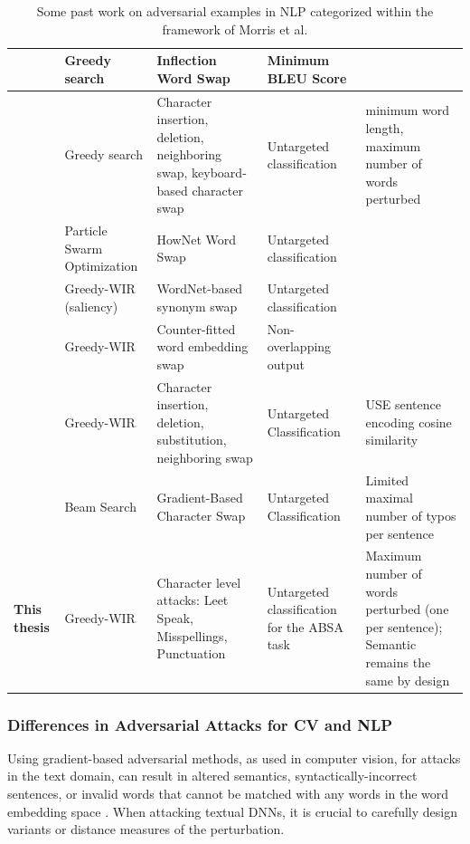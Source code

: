 \begin{table}[t]
\begin{adjustwidth}{-0cm}{}
\small
\begin{tabular}{p{2cm}|p{2cm}p{3cm}p{2cm}p{4cm}}


\midrule
\textbf{\cite{tan2020s}}&Greedy search &Inflection Word Swap &Minimum BLEU Score & \\
\midrule
\textbf{\cite{pruthi2019combating}} &Greedy search &Character insertion, deletion, neighboring swap, keyboard-based character swap &Untargeted classification &minimum word length, maximum number of words perturbed \\
\midrule
\textbf{\cite{zang2020word}} &Particle Swarm Optimization&HowNet Word Swap &Untargeted classification & \\
\midrule
\textbf{\cite{ren2019generating}} &Greedy-WIR (saliency) &WordNet-based synonym swap &Untargeted classification & \\
\midrule
\textbf{\cite{cheng2020seq2sick}} &Greedy-WIR &Counter-fitted word embedding swap &Non-overlapping output & \\
\midrule
\textbf{\cite{li2018textbugger}} &Greedy-WIR &Character insertion, deletion, substitution, neighboring swap&Untargeted Classification &USE sentence encoding cosine similarity \\
\midrule
\textbf{\cite{sun2020adv}} &Beam Search &Gradient-Based Character Swap&Untargeted Classification &Limited maximal number of typos per sentence\\
\midrule
\textbf{This thesis} &Greedy-WIR &Character level attacks: Leet Speak, Misspellings, Punctuation &Untargeted classification for the ABSA task &Maximum number of words perturbed (one per sentence); Semantic remains the same by design \\
\bottomrule
\end{tabular}
\end{adjustwidth}
\caption[Past work on adversarial examples in NLP]{Some past work on adversarial examples in NLP categorized within the framework of Morris et al.}
\label{tab:loooong}
\end{table}

\subsubsection{Differences in Adversarial Attacks for CV and NLP }
\label{sec:differences_in_adv-ex}

Using gradient-based adversarial methods, as used in computer vision, for attacks in the text domain, can result in altered semantics, syntactically-incorrect sentences, or invalid words that cannot be matched with any words in the word embedding space \cite{zhang2019adversarial}. When attacking textual DNNs, it is crucial to carefully design variants or distance measures of the perturbation.


